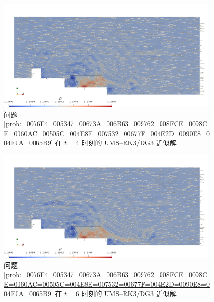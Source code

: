 \begin{figure}[h!]
\begin{centering}
\includegraphics[width=1\textwidth,height=0.4\textheight,keepaspectratio]{figures/ship/a=0_p=3/Frame40}
\par\end{centering}
\caption{\label{fig:ship_a=00003D0_t=00003D4_p=00003D3}问题 \ref{prob:=0076F4=005347=00673A=006B63=009762=008FCE=0098CE=0060AC=00505C=004E8E=007532=00677F=004E2D=0090E8=004E0A=0065B9}
在 $t=4$ 时刻的 UMS–RK3/DG3 近似解}
\end{figure}

\begin{figure}[h!]
\begin{centering}
\includegraphics[width=1\textwidth,height=0.4\textheight,keepaspectratio]{figures/ship/a=0_p=3/Frame60}
\par\end{centering}
\caption{\label{fig:ship_a=00003D0_t=00003D6_p=00003D3}问题 \ref{prob:=0076F4=005347=00673A=006B63=009762=008FCE=0098CE=0060AC=00505C=004E8E=007532=00677F=004E2D=0090E8=004E0A=0065B9}
在 $t=6$ 时刻的 UMS–RK3/DG3 近似解}
\end{figure}

